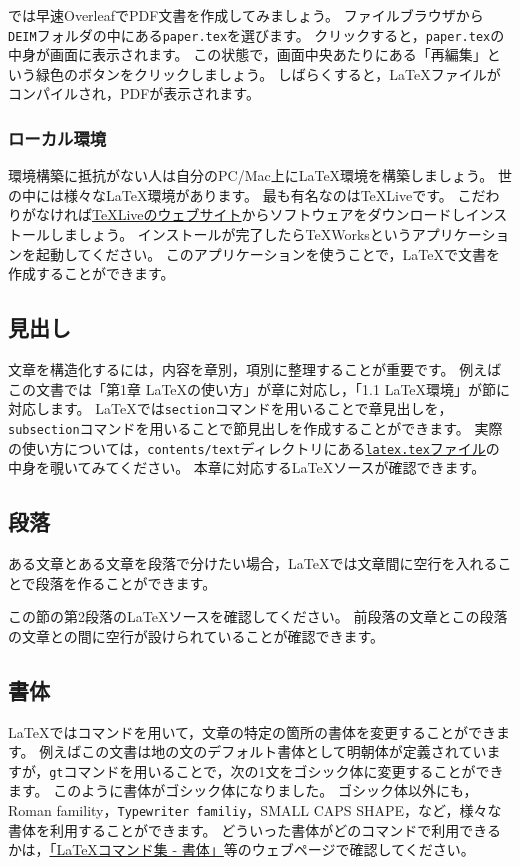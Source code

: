 では早速OverleafでPDF文書を作成してみましょう。
ファイルブラウザから\texttt{DEIM}フォルダの中にある\texttt{paper.tex}を選びます。
クリックすると，\texttt{paper.tex}の中身が画面に表示されます。
この状態で，画面中央あたりにある「再編集」という緑色のボタンをクリックしましょう。
しばらくすると，LaTeXファイルがコンパイルされ，PDFが表示されます。

\subsubsection{ローカル環境}
環境構築に抵抗がない人は自分のPC/Mac上にLaTeX環境を構築しましょう。
世の中には様々なLaTeX環境があります。
最も有名なのはTeXLiveです。
こだわりがなければ\href{https://texwiki.texjp.org/?TeX%20Live%2FWindows}{TeXLiveのウェブサイト}からソフトウェアをダウンロードしインストールしましょう。
インストールが完了したらTeXWorksというアプリケーションを起動してください。
このアプリケーションを使うことで，LaTeXで文書を作成することができます。

\subsection{見出し}
文章を構造化するには，内容を章別，項別に整理することが重要です。
例えばこの文書では「第1章 LaTeXの使い方」が章に対応し，「1.1 LaTeX環境」が節に対応します。
LaTeXでは\texttt{section}コマンドを用いることで章見出しを，\texttt{subsection}コマンドを用いることで節見出しを作成することができます。
実際の使い方については，\texttt{contents/text}ディレクトリにある\href{https://github.com/ymmt3-lab/DEIM-and-Thesis/blob/master/contents/text/latex.tex}{\texttt{latex.tex}ファイル}の中身を覗いてみてください。
本章に対応するLaTeXソースが確認できます。


\subsection{段落}
ある文章とある文章を段落で分けたい場合，LaTeXでは文章間に空行を入れることで段落を作ることができます。

この節の第2段落のLaTeXソースを確認してください。
前段落の文章とこの段落の文章との間に空行が設けられていることが確認できます。


\subsection{書体}
LaTeXではコマンドを用いて，文章の特定の箇所の書体を変更することができます。
例えばこの文書は地の文のデフォルト書体として明朝体が定義されていますが，{\tt gt}コマンドを用いることで，次の1文をゴシック体に変更することができます。
{\gt このように書体がゴシック体になりました。}
{\gt ゴシック体}以外にも，{\rm Roman famility}，{\tt Typewriter familiy}，{\sc SMALL CAPS SHAPE}，など，様々な書体を利用することができます。
どういった書体がどのコマンドで利用できるかは，\href{http://www.latex-cmd.com/style/style.html}{「LaTeXコマンド集 - 書体」}等のウェブページで確認してください。


